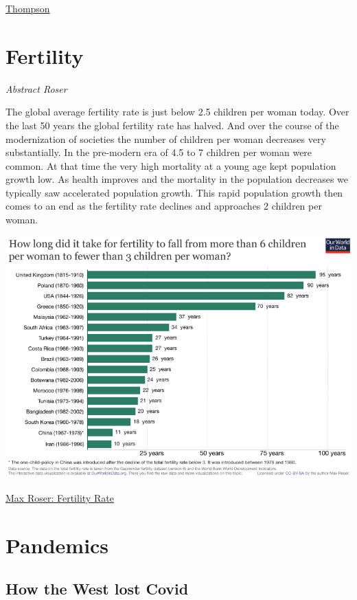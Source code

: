 \documentclass[
]{book}
\begin{document}
\href{https://engelsbergideas.com/essays/the-geopolitical-fight-to-come-over-green-energy/}{Thompson}

\hypertarget{fertility}{%
\chapter{Fertility}\label{fertility}}

\emph{Abstract Roser}

The global average fertility rate is just below 2.5 children per woman today. Over the last 50 years the global fertility rate has halved. And over the course of the modernization of societies the number of children per woman decreases very substantially. In the pre-modern era of 4.5 to 7 children per woman were common. At that time the very high mortality at a young age kept population growth low. As health improves and the mortality in the population decreases we typically saw accelerated population growth. This rapid population growth then comes to an end as the fertility rate declines and approaches 2 children per woman.

\includegraphics{fig/fertility_fall_countries.png}

\href{https://ourworldindata.org/fertility-rate}{Max Roser: Fertility Rate}

\hypertarget{pandemics}{%
\chapter{Pandemics}\label{pandemics}}

\hypertarget{how-the-west-lost-covid}{%
\section{How the West lost Covid}\label{how-the-west-lost-covid}}
\end{document}

